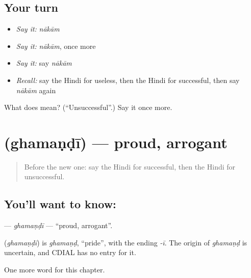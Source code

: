 \subsection*{Your turn}
\begin{itemize}
\raggedright
  \item \emph{Say it:} \emph{nākām}
  \item \emph{Say it:} \emph{nākām}, once more
  \item \emph{Say it:} say \emph{nākām}
  \item \emph{Recall:} say the Hindi for useless, then the Hindi for successful, then say \emph{nākām} again
\end{itemize}

\begin{tcolorbox}[breakable,colback=teal!4,colframe=teal!35!black,title={Before you move on}]
What does  mean? (\textquotedblleft{}Unsuccessful\textquotedblright{}.) Say it once more.
\end{tcolorbox}
\section[\texorpdfstring{\hi{घमंडी} (ghamaṇḍī)}{घमंडी (ghamaṇḍī)}]{ (ghamaṇḍī) — proud, arrogant}

\label{lesson:HI-C243-ghamandi}



\begin{quote}
Before the new one: say the Hindi for successful, then the Hindi for unsuccessful.
\end{quote}

\subsection*{You'll want to know: }
\textbf{} — \emph{ghamaṇḍī} — \textquotedblleft{}proud, arrogant\textquotedblright{}.

\begin{cousinweb}
\textbf{} (\emph{ghamaṇḍī}) is \emph{ghamaṇḍ}, \textquotedblleft{}pride\textquotedblright{}, with the ending \emph{-ī}. The origin of \emph{ghamaṇḍ} is uncertain, and CDIAL has no entry for it.
\end{cousinweb}

\begin{grammarlens}[title={What you've built}]
One more word for this chapter.
\end{grammarlens}


